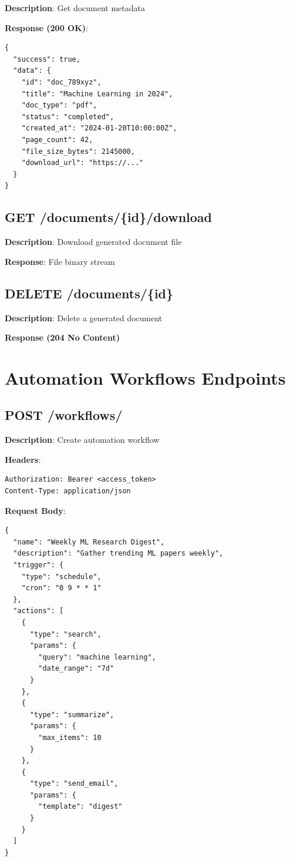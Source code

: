 \documentclass[12pt,a4paper]{report}
\begin{document}
\textbf{Description}: Get document metadata

\textbf{Response (200 OK)}:
\begin{lstlisting}
{
  "success": true,
  "data": {
    "id": "doc_789xyz",
    "title": "Machine Learning in 2024",
    "doc_type": "pdf",
    "status": "completed",
    "created_at": "2024-01-20T10:00:00Z",
    "page_count": 42,
    "file_size_bytes": 2145000,
    "download_url": "https://..."
  }
}
\end{lstlisting}

\section{GET /documents/\{id\}/download}

\textbf{Description}: Download generated document file

\textbf{Response}: File binary stream

\section{DELETE /documents/\{id\}}

\textbf{Description}: Delete a generated document

\textbf{Response (204 No Content)}

\chapter{Automation Workflows Endpoints}

\section{POST /workflows/}

\textbf{Description}: Create automation workflow

\textbf{Headers}:
\begin{lstlisting}
Authorization: Bearer <access_token>
Content-Type: application/json
\end{lstlisting}

\textbf{Request Body}:
\begin{lstlisting}
{
  "name": "Weekly ML Research Digest",
  "description": "Gather trending ML papers weekly",
  "trigger": {
    "type": "schedule",
    "cron": "0 9 * * 1"
  },
  "actions": [
    {
      "type": "search",
      "params": {
        "query": "machine learning",
        "date_range": "7d"
      }
    },
    {
      "type": "summarize",
      "params": {
        "max_items": 10
      }
    },
    {
      "type": "send_email",
      "params": {
        "template": "digest"
      }
    }
  ]
}
\end{lstlisting}
\end{document}
